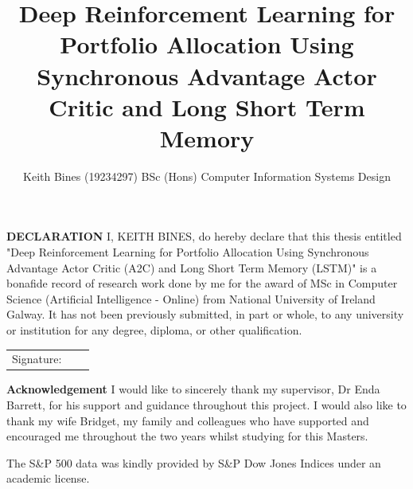 \documentclass[oneside,12pt]{Classes/RoboticsLaTeX}
\title{\Large{Deep Reinforcement Learning for Portfolio Allocation
Using Synchronous Advantage Actor Critic and Long Short Term Memory }}
\author{Keith Bines (19234297) 
  BSc (Hons) Computer Information Systems Design}
\begin{document}
\begin{spacing}{1}
\maketitle
\end{spacing}


\setcounter{secnumdepth}{3}
\setcounter{tocdepth}{3}

\frontmatter
\textbf{DECLARATION} 
I, KEITH BINES, do hereby declare that this thesis entitled "Deep Reinforcement Learning for Portfolio Allocation Using Synchronous Advantage Actor Critic (A2C) and Long Short Term Memory (LSTM)" is a bonafide record of research work done by me for the award of MSc in Computer Science (Artificial Intelligence - Online) from National University of Ireland Galway. It has not been previously submitted, in part or whole, to any university or institution for any degree, diploma, or other qualification. 
\newline

\begin{tabular}{@{}p{.5in}p{4in}@{}}
Signature: & ~~\hrulefill \\
\end{tabular}
\newpage


\textbf{Acknowledgement}
I would like to sincerely thank my supervisor, Dr Enda Barrett, for his support and guidance throughout this project. I would also like to thank my wife Bridget, my family and colleagues who have supported and encouraged me throughout the two years whilst studying for this Masters.

The S\&P 500 data was kindly provided by S\&P Dow Jones Indices under an academic license.
\end{document}
